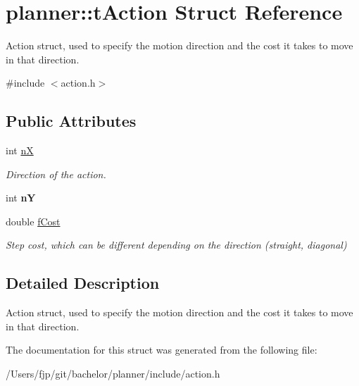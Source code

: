 \hypertarget{structplanner_1_1t_action}{}\section{planner\+:\+:t\+Action Struct Reference}
\label{structplanner_1_1t_action}


Action struct, used to specify the motion direction and the cost it takes to move in that direction.  




{\ttfamily \#include $<$action.\+h$>$}

\subsection*{Public Attributes}
\begin{DoxyCompactItemize}
\item 
\mbox{\label{structplanner_1_1t_action_a6cf36892b4601d7d267d1a9d2e9d6595}} 
int \mbox{\hyperlink{structplanner_1_1t_action_a6cf36892b4601d7d267d1a9d2e9d6595}{nX}}
\begin{DoxyCompactList}\small\item\em Direction of the action. \end{DoxyCompactList}\item 
\mbox{\label{structplanner_1_1t_action_a382637fed2bbf09a18d5f42201704314}} 
int {\bfseries nY}
\item 
\mbox{\label{structplanner_1_1t_action_a7bac43507f0daab4fb5850c66e1da9d2}} 
double \mbox{\hyperlink{structplanner_1_1t_action_a7bac43507f0daab4fb5850c66e1da9d2}{f\+Cost}}
\begin{DoxyCompactList}\small\item\em Step cost, which can be different depending on the direction (straight, diagonal) \end{DoxyCompactList}\end{DoxyCompactItemize}


\subsection{Detailed Description}
Action struct, used to specify the motion direction and the cost it takes to move in that direction. 

The documentation for this struct was generated from the following file\+:\begin{DoxyCompactItemize}
\item 
/\+Users/fjp/git/bachelor/planner/include/action.\+h\end{DoxyCompactItemize}

